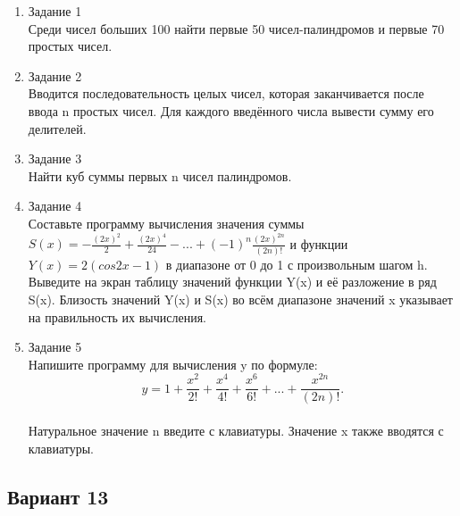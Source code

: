 \documentclass[a4paper]{article}
\begin{document}
	
	\begin{enumerate} 
		\item Задание 1 \\
		Среди чисел больших 100 найти первые 50 чисел-палиндромов и первые 70 простых чисел.\\
		\item Задание 2\\
		Вводится последовательность целых чисел, которая заканчивается после ввода n простых чисел. Для каждого введённого числа вывести сумму его делителей.\\
		\item Задание 3 \\
		Найти куб суммы первых n чисел палиндромов.\\
		\item Задание 4 \\ 
		Составьте программу вычисления значения суммы  $S(x)=-\frac{(2x)^2}{2}+\frac{(2x)^4}{24}-...+(-1)^n\frac{(2x)^{2n}}{(2n)!}$
		и функции $Y(x)=2(cos{2x}-1)$ в диапазоне от 0 до 1
		с произвольным шагом h. Выведите на экран таблицу значений функции Y(x) и её разложение в ряд S(x). Близость значений Y(x) и S(x) во всём диапазоне
		значений x указывает на правильность их вычисления.\\
		\item Задание 5 \\
		Напишите программу для вычисления y по формуле:\\
		$$y=1+\frac{x^2}{2!}+\frac{x^4}{4!}+\frac{x^6}{6!}+...+\frac{x^{2n}}{(2n)!}.$$\\
		Натуральное значение n введите с клавиатуры. Значение x также вводятся с клавиатуры.\\
		
	\end{enumerate}
	
	\begin{center}
		\subsection*{Вариант 13}
	\end{center}
	
\end{document}
